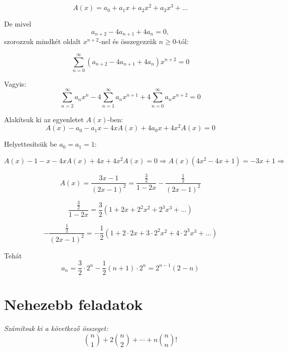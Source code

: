 \begin{solution}
\[
A(x)=a_{0}+a_{1}x+a_{2}x^{2}+a_{3}x^{3}+\dots
\]

De mivel 
\[
a_{n+2}-4a_{n+1}+4a_{n}=0,
\]
szorozzuk mindkét oldalt $x^{n+2}$-nel és összegezzük $n\geq0$-tól:

\[
\sum_{n=0}^{\infty}(a_{n+2}-4a_{n+1}+4a_{n})x^{n+2}=0
\]

Vagyis: 
\[
\sum_{n=2}^{\infty}a_{n}x^{n}-4\sum_{n=1}^{\infty}a_{n}x^{n+1}+4\sum_{n=0}^{\infty}a_{n}x^{n+2}=0
\]

Alakítsuk ki az egyenletet $A(x)$-ben: 
\[
A(x)-a_{0}-a_{1}x-4xA(x)+4a_{0}x+4x^{2}A(x)=0
\]

Helyettesítsük be $a_{0}=a_{1}=1$:

\[
A(x)-1-x-4xA(x)+4x+4x^{2}A(x)=0\Rightarrow A(x)(4x^{2}-4x+1)=-3x+1\Rightarrow
\]

\[
A(x)=\frac{3x-1}{(2x-1)^{2}}=\frac{\frac{3}{2}}{1-2x}-\frac{\frac{1}{2}}{(2x-1)^{2}}
\]

\[
\frac{\frac{3}{2}}{1-2x}=\frac{3}{2}\left(1+2x+2^{2}x^{2}+2^{3}x^{3}+\dots\right)
\]

\[
-\frac{\frac{1}{2}}{(2x-1)^{2}}=-\frac{1}{2}\left(1+2\cdot2x+3\cdot2^{2}x^{2}+4\cdot2^{3}x^{3}+\dots\right)
\]

Tehát 
\[
a_{n}=\frac{3}{2}\cdot2^{n}-\frac{1}{2}(n+1)\cdot2^{n}=2^{n-1}(2-n)
\]
\end{solution}

\section*{Nehezebb feladatok}
\begin{extraproblem}
\textit{\emph{Számítsuk ki a következő összeget:}}\emph{ }
\[
\binom{n}{1}+2\binom{n}{2}+\cdots+n\binom{n}{n}!
\]
\end{extraproblem}

\bigskip{}


